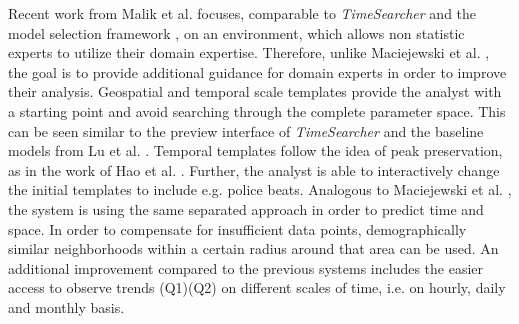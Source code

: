 \documentclass[electronic]{vgtc}             %
\begin{document}
Recent work from Malik et al. \cite{malik:2014} focuses, comparable to \textit{TimeSearcher} \cite{buono:2005} and the model selection framework \cite{lu:2014}, on an environment, which allows non statistic experts to utilize their domain expertise.
Therefore, unlike Maciejewski et al. \cite{maciejewski:2011}, the goal is to provide additional guidance for domain experts in order to improve their analysis.
Geospatial and temporal scale templates provide the analyst with a starting point and avoid searching through the complete parameter space.
This can be seen similar to the preview interface of \textit{TimeSearcher} \cite{buono:2005} and the baseline models from Lu et al. \cite{lu:2014}.
Temporal templates follow the idea of peak preservation, as in the work of Hao et al. \cite{Hao:2012}.
Further, the analyst is able to interactively change the initial templates to include e.g. police beats.
Analogous to Maciejewski et al. \cite{maciejewski:2011, maciejewski:2010}, the system is using the same separated approach in order to predict time and space.
In order to compensate for insufficient data points, demographically similar neighborhoods within a certain radius around that area can be used. 
An additional improvement compared to the previous systems includes the easier access to observe trends (Q1)(Q2) on different scales of time, i.e. on hourly, daily and monthly basis.
\end{document}
